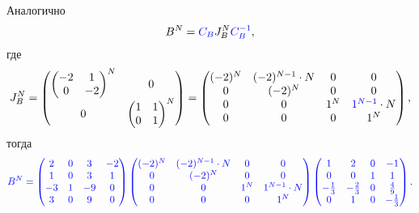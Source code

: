 \documentclass[12pt]{article}
\begin{document}
    Аналогично
    \[
        B^N = \textcolor{blue}{C_B} J_B^N \textcolor{blue}{C_B^{-1}} ,
    \]
    где
    \[
        J_B^N
        = \begin{pmatrix}
              \begin{pmatrix}
                  -2 & 1  \\
                  0  & -2
              \end{pmatrix}^N & 0 \\
              0 & \begin{pmatrix}
                      1 & 1 \\
                      0 & 1
              \end{pmatrix}^N
        \end{pmatrix}
        =
        \begin{pmatrix}
        (-2)
            ^N & (-2)^{N-1} \cdot N & 0   & 0                                 \\
            0  & (-2)^N             & 0   & 0                                 \\
            0  & 0                  & 1^N & \textcolor{blue}{1^{N-1}} \cdot N \\
            0  & 0                  & 0   & 1^N                               \\
        \end{pmatrix},
    \]
    тогда
    \[
        \color{blue}
        B^N
        = \begin{pmatrix}
              2  & 0 & 3  & -2 \\
              1  & 0 & 3  & 1  \\
              -3 & 1 & -9 & 0  \\
              3  & 0 & 9  & 0
        \end{pmatrix}
        \begin{pmatrix}
        (-2)
            ^N & (-2)^{N-1} \cdot N & 0   & 0                                 \\
            0  & (-2)^N             & 0   & 0                                 \\
            0  & 0                  & 1^N & \textcolor{blue}{1^{N-1}} \cdot N \\
            0  & 0                  & 0   & 1^N                               \\
        \end{pmatrix}
        \begin{pmatrix}
            1             & 2             & 0 & -1            \\
            0             & 0             & 1 & 1             \\
            - \frac{1}{3} & - \frac{2}{3} & 0 & \frac{4}{9}   \\
            0             & 1             & 0 & - \frac{1}{3}
        \end{pmatrix}
        .
    \]
\end{document}
